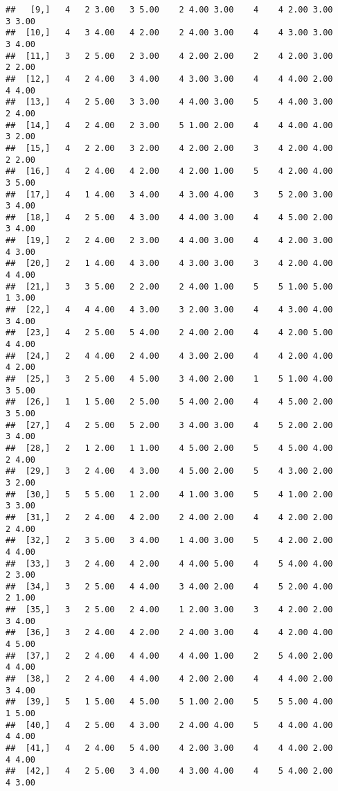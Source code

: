 \documentclass[]{article}
\begin{document}
\begin{verbatim}
##   [9,]   4   2 3.00   3 5.00    2 4.00 3.00    4    4 2.00 3.00    3 3.00
##  [10,]   4   3 4.00   4 2.00    2 4.00 3.00    4    4 3.00 3.00    3 4.00
##  [11,]   3   2 5.00   2 3.00    4 2.00 2.00    2    4 2.00 3.00    2 2.00
##  [12,]   4   2 4.00   3 4.00    4 3.00 3.00    4    4 4.00 2.00    4 4.00
##  [13,]   4   2 5.00   3 3.00    4 4.00 3.00    5    4 4.00 3.00    2 4.00
##  [14,]   4   2 4.00   2 3.00    5 1.00 2.00    4    4 4.00 4.00    3 2.00
##  [15,]   4   2 2.00   3 2.00    4 2.00 2.00    3    4 2.00 4.00    2 2.00
##  [16,]   4   2 4.00   4 2.00    4 2.00 1.00    5    4 2.00 4.00    3 5.00
##  [17,]   4   1 4.00   3 4.00    4 3.00 4.00    3    5 2.00 3.00    3 4.00
##  [18,]   4   2 5.00   4 3.00    4 4.00 3.00    4    4 5.00 2.00    3 4.00
##  [19,]   2   2 4.00   2 3.00    4 4.00 3.00    4    4 2.00 3.00    4 3.00
##  [20,]   2   1 4.00   4 3.00    4 3.00 3.00    3    4 2.00 4.00    4 4.00
##  [21,]   3   3 5.00   2 2.00    2 4.00 1.00    5    5 1.00 5.00    1 3.00
##  [22,]   4   4 4.00   4 3.00    3 2.00 3.00    4    4 3.00 4.00    3 4.00
##  [23,]   4   2 5.00   5 4.00    2 4.00 2.00    4    4 2.00 5.00    4 4.00
##  [24,]   2   4 4.00   2 4.00    4 3.00 2.00    4    4 2.00 4.00    4 2.00
##  [25,]   3   2 5.00   4 5.00    3 4.00 2.00    1    5 1.00 4.00    3 5.00
##  [26,]   1   1 5.00   2 5.00    5 4.00 2.00    4    4 5.00 2.00    3 5.00
##  [27,]   4   2 5.00   5 2.00    3 4.00 3.00    4    5 2.00 2.00    3 4.00
##  [28,]   2   1 2.00   1 1.00    4 5.00 2.00    5    4 5.00 4.00    2 4.00
##  [29,]   3   2 4.00   4 3.00    4 5.00 2.00    5    4 3.00 2.00    3 2.00
##  [30,]   5   5 5.00   1 2.00    4 1.00 3.00    5    4 1.00 2.00    3 3.00
##  [31,]   2   2 4.00   4 2.00    2 4.00 2.00    4    4 2.00 2.00    2 4.00
##  [32,]   2   3 5.00   3 4.00    1 4.00 3.00    5    4 2.00 2.00    4 4.00
##  [33,]   3   2 4.00   4 2.00    4 4.00 5.00    4    5 4.00 4.00    2 3.00
##  [34,]   3   2 5.00   4 4.00    3 4.00 2.00    4    5 2.00 4.00    2 1.00
##  [35,]   3   2 5.00   2 4.00    1 2.00 3.00    3    4 2.00 2.00    3 4.00
##  [36,]   3   2 4.00   4 2.00    2 4.00 3.00    4    4 2.00 4.00    4 5.00
##  [37,]   2   2 4.00   4 4.00    4 4.00 1.00    2    5 4.00 2.00    4 4.00
##  [38,]   2   2 4.00   4 4.00    4 2.00 2.00    4    4 4.00 2.00    3 4.00
##  [39,]   5   1 5.00   4 5.00    5 1.00 2.00    5    5 5.00 4.00    1 5.00
##  [40,]   4   2 5.00   4 3.00    2 4.00 4.00    5    4 4.00 4.00    4 4.00
##  [41,]   4   2 4.00   5 4.00    4 2.00 3.00    4    4 4.00 2.00    4 4.00
##  [42,]   4   2 5.00   3 4.00    4 3.00 4.00    4    5 4.00 2.00    4 3.00

\end{verbatim}
\end{document}
